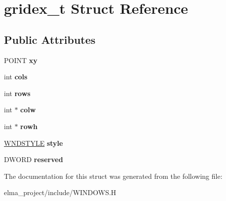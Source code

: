 \hypertarget{structgridex__t}{}\section{gridex\+\_\+t Struct Reference}
\label{structgridex__t}
\subsection*{Public Attributes}
\begin{DoxyCompactItemize}
\item 
\mbox{\label{structgridex__t_ae9df1410669da512d33be2c3d41deaca}} 
P\+O\+I\+NT {\bfseries xy}
\item 
\mbox{\label{structgridex__t_a2da8bb3167c7f6607479808470d1eb73}} 
int {\bfseries cols}
\item 
\mbox{\label{structgridex__t_a9bd2656e476960ed9dd6fc7f3e65a4a2}} 
int {\bfseries rows}
\item 
\mbox{\label{structgridex__t_a589b415a082f239599a681b420fa6c5d}} 
int $\ast$ {\bfseries colw}
\item 
\mbox{\label{structgridex__t_a59a0c9c1a7fd1cb85d1821317c548e68}} 
int $\ast$ {\bfseries rowh}
\item 
\mbox{\label{structgridex__t_a62c6fdd08cc1e07bc5c2bac0fae52d40}} 
\mbox{\hyperlink{struct_w_n_d_s_t_y_l_e}{W\+N\+D\+S\+T\+Y\+LE}} {\bfseries style}
\item 
\mbox{\label{structgridex__t_a23733c665e2d6f42feec2f8bef8ea19d}} 
D\+W\+O\+RD {\bfseries reserved}
\end{DoxyCompactItemize}


The documentation for this struct was generated from the following file\+:\begin{DoxyCompactItemize}
\item 
elma\+\_\+project/include/W\+I\+N\+D\+O\+W\+S.\+H\end{DoxyCompactItemize}
